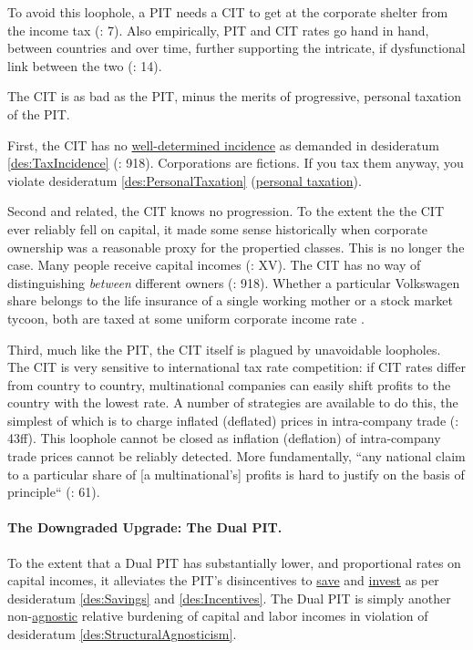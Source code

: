 To avoid this loophole, a PIT needs a CIT to get at the corporate shelter from the income tax (\citealt{Genschel2005}: 7). Also empirically, PIT and CIT rates go hand in hand, between countries and over time, further supporting the intricate, if dysfunctional link between the two (\citealt{Piatkowski2008}: 14).

The CIT is as bad as the PIT, minus the merits of progressive, personal taxation of the PIT.

First, the CIT has no \hyperref[des:TaxIncidence]{well-determined incidence} as demanded in desideratum \ref{des:TaxIncidence} (\citealt{McCaffery2005}: 918). Corporations are fictions. If you tax them anyway, you violate desideratum \ref{des:PersonalTaxation} (\hyperref[des:PersonalTaxation]{personal taxation}).

Second and related, the CIT knows no progression. To the extent the the CIT ever reliably fell on capital, it made some sense historically when corporate ownership was a reasonable proxy for the propertied classes. This is no longer the case. Many people receive capital incomes (\citealt{Grabka2007a}: XV). The CIT has no way of distinguishing \emph{between} different owners (\citealt{McCaffery2005}: 918). Whether a particular Volkswagen share belongs to the life insurance of a single working mother or a stock market tycoon, both are taxed at some uniform corporate income rate . %

Third, much like the PIT, the CIT itself is plagued by unavoidable loopholes. The CIT is very sensitive to international tax rate competition: if CIT rates differ from country to country, multinational companies can easily shift profits to the country with the lowest rate. A number of strategies are available to do this, the simplest of which is to charge inflated (deflated) prices in intra-company trade (\citealt{Ganghof2004}: 43ff).
This loophole cannot be closed as inflation (deflation) of intra-company trade prices cannot be reliably detected. More fundamentally, ``any national claim to a particular share of [a multinational's] profits is hard to justify on the basis of principle`` (\citealt{Genschel2005}: 61). %

\paragraph{The Downgraded Upgrade: The Dual PIT.}  \label{sec:ScoreDualPIT} To the extent that a Dual PIT has substantially lower, and proportional rates on capital incomes, it alleviates the PIT's disincentives to \hyperref[des:Savings]{save} and \hyperref[des:Incentives]{invest} as per desideratum \ref{des:Savings} and \ref{des:Incentives}. The Dual PIT is simply another non-\hyperref[des:StructuralAgnosticism]{agnostic} relative burdening of capital and labor incomes in violation of desideratum \ref{des:StructuralAgnosticism}.

